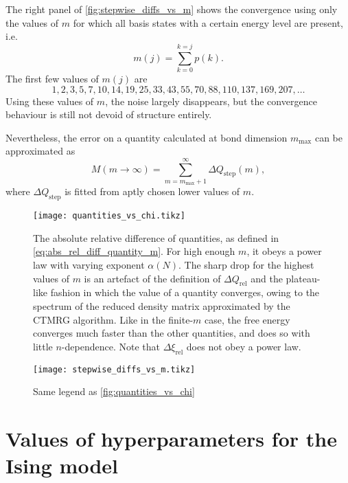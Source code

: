 The right panel of \autoref{fig:stepwise_diffs_vs_m} shows the convergence using only the values of $m$ for which all basis states with a certain energy level are present, i.e. \cite{okunishi1999universal}
\begin{equation}
  m(j) = \sum_{k = 0}^{k = j} p(k).
\end{equation}
The first few values of $m(j)$ are
\begin{equation}\label{eq:m_values_all_degenerate_basis_states}
  1, 2, 3, 5, 7, 10, 14, 19, 25, 33, 43, 55, 70, 88, 110, 137, 169, 207, \dots
\end{equation}
Using these values of $m$, the noise largely disappears, but the convergence behaviour is still not devoid of structure entirely.

Nevertheless, the error on a quantity calculated at bond dimension $m_{\text{max}}$ can be approximated as
\begin{equation}
  M(m \to \infty) = \sum_{m = m_{\text{max}} + 1}^{\infty} \Delta Q_{\text{step}}(m),
\end{equation}
where $\Delta Q_{\text{step}}$ is fitted from aptly chosen lower values of $m$.


\begin{figure}
  \texttt{[image: quantities\_vs\_chi.tikz]}
  \caption{The absolute relative difference of quantities, as defined in \autoref{eq:abs_rel_diff_quantity_m}.
  For high enough $m$, it obeys a power law with varying exponent $\alpha(N)$.
  The sharp drop for the highest values of $m$ is an artefact of the definition of $\Delta Q_{\text{rel}}$ and the
  plateau-like fashion in which the value of a quantity converges,
  owing to the spectrum of the reduced density matrix approximated by the CTMRG algorithm.
  Like in the finite-$m$ case, the free energy converges much faster than the other quantities,
  and does so with little $n$-dependence.
  Note that $\Delta \xi_{\text{rel}}$ does not obey a power law.}\label{fig:quantities_vs_chi}
\end{figure}

\begin{figure}
  \texttt{[image: stepwise\_diffs\_vs\_m.tikz]}
  \caption{Same legend as \autoref{fig:quantities_vs_chi}}\label{fig:stepwise_diffs_vs_m}
\end{figure}


\section{Values of hyperparameters for the Ising model}

